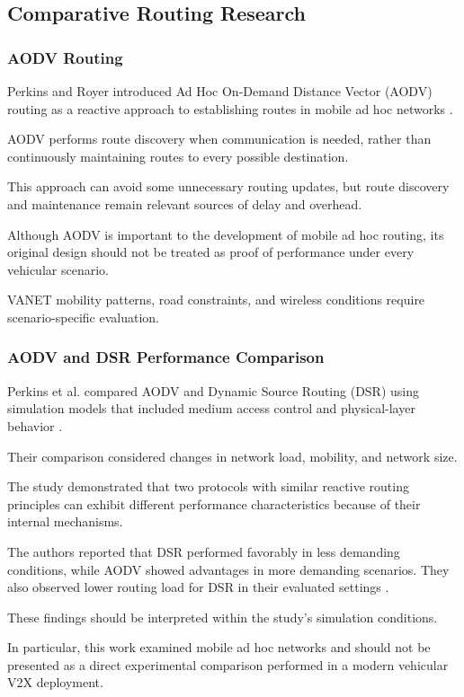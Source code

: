 \subsection{Comparative Routing Research}

\subsubsection{AODV Routing}

Perkins and Royer introduced
Ad Hoc On-Demand Distance Vector
(AODV) routing as a reactive
approach to establishing routes
in mobile ad hoc networks
\cite{Perkins1999}.

AODV performs route discovery
when communication is needed,
rather than continuously
maintaining routes to every
possible destination.

This approach can avoid some
unnecessary routing updates,
but route discovery and
maintenance remain relevant
sources of delay and overhead.

Although AODV is important
to the development of mobile
ad hoc routing, its original
design should not be treated
as proof of performance
under every vehicular scenario.

VANET mobility patterns,
road constraints, and
wireless conditions require
scenario-specific evaluation.

\subsubsection{AODV and DSR Performance Comparison}

Perkins et al. compared AODV
and Dynamic Source Routing (DSR)
using simulation models that
included medium access control
and physical-layer behavior
\cite{Perkins2001}.

Their comparison considered
changes in network load,
mobility, and network size.

The study demonstrated that
two protocols with similar
reactive routing principles
can exhibit different
performance characteristics
because of their internal
mechanisms.

The authors reported that
DSR performed favorably in
less demanding conditions,
while AODV showed advantages
in more demanding scenarios.
They also observed lower
routing load for DSR in
their evaluated settings
\cite{Perkins2001}.

These findings should be
interpreted within the
study's simulation conditions.

In particular, this work
examined mobile ad hoc
networks and should not
be presented as a direct
experimental comparison
performed in a modern
vehicular V2X deployment.

